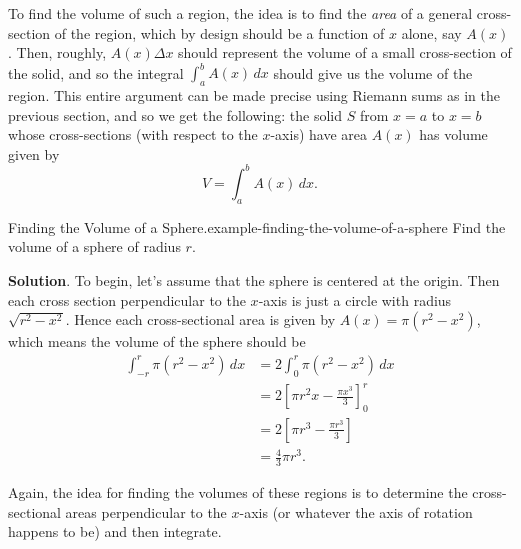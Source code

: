 \documentclass[10pt,]{book}
\numberwithin{equation}{section}
\newcommand{\amp}{&}
\begin{document}
\hypertarget{p-629}{}%
To find the volume of such a region, the idea is to find the \emph{area} of a general cross-section of the region, which by design should be a function of \(x\) alone, say \(A(x)\). Then, roughly, \(A(x)\Delta x\) should represent the volume of a small cross-section of the solid, and so the integral \(\int_{a}^{b}A(x)\,dx\) should give us the volume of the region. This entire argument can be made precise using Riemann sums as in the previous section, and so we get the following: the solid \(S\) from \(x = a\) to \(x = b\) whose cross-sections (with respect to the \(x\)-axis) have area \(A(x)\) has volume given by%
\begin{equation}
V = \int_{a}^{b}A(x)\,dx.\label{equation-solid-revolution-volume}
\end{equation}
%
\begin{example}{Finding the Volume of a Sphere.}{example-finding-the-volume-of-a-sphere}%
\hypertarget{p-630}{}%
Find the volume of a sphere of radius \(r\).%
\par\smallskip%
\noindent\textbf{Solution}.\hypertarget{solution-137}{}\quad%
\hypertarget{p-631}{}%
To begin, let's assume that the sphere is centered at the origin. Then each cross section perpendicular to the \(x\)-axis is just a circle with radius \(\sqrt{r^{2} - x^{2}}\). Hence each cross-sectional area is given by \(A(x) = \pi(r^{2} - x^{2})\), which means the volume of the sphere should be%
\begin{align*}
\int_{-r}^{r}\pi(r^{2} - x^{2})\,dx \amp= 2\int_{0}^{r}\pi(r^{2} - x^{2})\,dx\\
\amp= 2\left[\pi r^{2}x - \frac{\pi x^{3}}{3}\right]_{0}^{r}\\
\amp= 2\left[\pi r^{3} - \frac{\pi r^{3}}{3}\right]\\
\amp= \frac{4}{3}\pi r^{3}.
\end{align*}
%
\end{example}
\hypertarget{p-632}{}%
Again, the idea for finding the volumes of these regions is to determine the cross-sectional areas perpendicular to the \(x\)-axis (or whatever the axis of rotation happens to be) and then integrate.%
\end{document}
